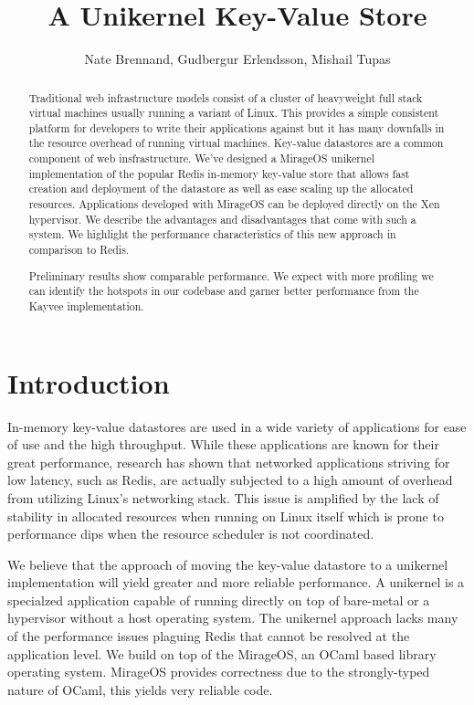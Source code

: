 \documentclass[english,10pt,twocolumn]{article}
\begin{document}
\title{A Unikernel Key-Value Store}
\author{Nate Brennand, Gudbergur Erlendsson, Mishail Tupas}
\date{}
\maketitle
\thispagestyle{empty}


\begin{abstract}
Traditional web infrastructure models consist of a cluster of heavyweight full stack virtual machines usually running a variant of Linux.
This provides a simple consistent platform for developers to write their applications against but it has many downfalls in the resource overhead of running virtual machines.
Key-value datastores are a common component of web insfrastructure.
We've designed a MirageOS\cite{mirage} unikernel implementation of the popular Redis\cite{redis} in-memory key-value store that allows fast creation and deployment of the datastore as well as ease scaling up the allocated resources.
Applications developed with MirageOS can be deployed directly on the Xen hypervisor.
We describe the advantages and disadvantages that come with such a system.
We highlight the performance characteristics of this new approach in comparison to Redis.

Preliminary results show comparable performance.
We expect with more profiling we can identify the hotspots in our codebase and garner better performance from the Kayvee implementation.
\end{abstract}


\section{Introduction}
In-memory key-value datastores are used in a wide variety of applications for ease of use and the high throughput.
While these applications are known for their great performance, research has shown that networked applications striving for low latency, such as Redis, are actually subjected to a high amount of overhead from utilizing Linux's networking stack.\cite{arrakis}
This issue is amplified by the lack of stability in allocated resources when running on Linux itself which is prone to performance dips when the resource scheduler is not coordinated.

We believe that the approach of moving the key-value datastore to a unikernel implementation will yield greater and more reliable performance.
A unikernel is a specialzed application capable of running directly on top of bare-metal or a hypervisor without a host operating system.
The unikernel approach lacks many of the performance issues plaguing Redis that cannot be resolved at the application level.
We build on top of the MirageOS\cite{mirage}, an OCaml based library operating system.
MirageOS provides correctness due to the strongly-typed nature of OCaml, this yields very reliable code.
\end{document}
